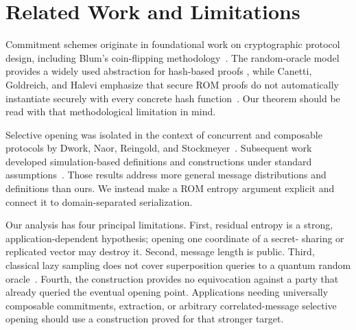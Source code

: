 \section{Related Work and Limitations}
\label{sec:related}

Commitment schemes originate in foundational work on cryptographic protocol
design, including Blum's coin-flipping methodology~\cite{Blum1983}.  The
random-oracle model provides a widely used abstraction for hash-based proofs
\cite{BellareRogaway1993}, while Canetti, Goldreich, and Halevi emphasize that
secure ROM proofs do not automatically instantiate securely with every
concrete hash function~\cite{CanettiEtAl1998}.  Our theorem should be read with
that methodological limitation in mind.

Selective opening was isolated in the context of concurrent and composable
protocols by Dwork, Naor, Reingold, and Stockmeyer~\cite{DworkEtAl2003}.
Subsequent work developed simulation-based definitions and constructions under
standard assumptions~\cite{BellareHofheinzYilek2012}.  Those results address
more general message distributions and definitions than ours.  We instead
make a ROM entropy argument explicit and connect it to domain-separated
serialization.

Our analysis has four principal limitations.  First, residual entropy is a
strong, application-dependent hypothesis; opening one coordinate of a secret-
sharing or replicated vector may destroy it.  Second, message length is public.
Third, classical lazy sampling does not cover superposition queries to a
quantum random oracle~\cite{Unruh2015}.  Fourth, the construction provides no
equivocation against a party that already queried the eventual opening point.
Applications needing universally composable commitments, extraction, or
arbitrary correlated-message selective opening should use a construction
proved for that stronger target.
